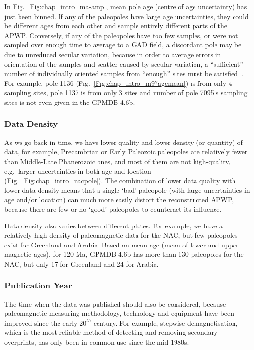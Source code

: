 In Fig.~\ref{Fig:chap_intro_ma-amp}, mean pole age (centre of age uncertainty)
has just been binned. If any of the paleopoles have large age uncertainties,
they could be different ages from each other and sample entirely different parts
of the APWP\@. Conversely, if any of the paleopoles have too few samples, or
were not sampled over enough time to average to a GAD field, a discordant pole
may be due to unreduced secular variation, because in order to average errors in
orientation of the samples and scatter caused by secular variation, a
``sufficient'' number of individually oriented samples from ``enough'' sites
must be satisfied~\citep{v90,B02,T20}. For example, pole 1136
(Fig.~\ref{Fig:chap_intro_in97agemean}) is from only 4 sampling sites, pole 1137
is from only 3 sites and number of pole 7095's sampling sites is not even given
in the GPMDB 4.6b.

\subsubsection{Data Density}\label{sec:datden}

As we go back in time, we have lower quality and lower density (or quantity) of
data, for example, Precambrian or Early Paleozoic paleopoles are relatively
fewer than Middle-Late Phanerozoic ones, and most of them are not high-quality,
e.g.\ larger uncertainties in both age and location
(Fig.~\ref{Fig:chap_intro_nacpole}). The combination of lower data quality with
lower data density means that a single `bad' paleopole (with large uncertainties
in age and/or location) can much more easily distort the reconstructed APWP,
because there are few or no `good' paleopoles to counteract its influence.

Data density also varies between different plates. For example, we have a
relatively high density of paleomagnetic data for the NAC, but few paleopoles
exist for Greenland and Arabia. Based on mean age (mean of lower and upper
magnetic ages), for 120 Ma, GPMDB 4.6b has more than 130 paleopoles
for the NAC, but only 17 for Greenland and 24 for Arabia.

\subsubsection{Publication Year}\label{sec:puby}

The time when the data was published should also be considered, because
paleomagnetic measuring methodology, technology and equipment have been improved
since the early $20^{th}$ century. For example, stepwise demagnetisation, which
is the most reliable method of detecting and removing secondary overprints, has
only been in common use since the mid 1980s.

